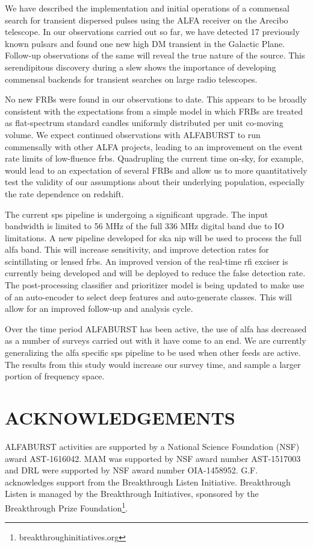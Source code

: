 \documentclass[a4paper,fleqn,usenatbib]{mnras}
\begin{document}
We have described the implementation and initial operations of a commensal
search for transient dispersed pulses using the ALFA receiver on the Arecibo
telescope. In our observations carried out so far, we have detected 17
previously known pulsars and found one new  high DM transient in the Galactic
Plane.  Follow-up observations of the same will reveal the true nature of the
source. This serendipitous discovery during a slew shows the importance of
developing commensal backends for transient searches on large radio telescopes.

No new FRBs were found in our observations to date. This appears to be broadly
consistent with the expectations from a simple model in which FRBs are treated
as flat-spectrum standard candles uniformly distributed per unit co-moving
volume. We expect continued observations with ALFABURST to run commensally with
other ALFA projects, leading to an improvement on the event rate limits of
low-fluence \glspl{frb}. Quadrupling the current time on-sky, for example,
would lead to an expectation of several FRBs and allow us to more
quantitatively test the validity of our assumptions about their underlying
population, especially the rate dependence on redshift.

The current \gls{sps} pipeline is undergoing a significant upgrade. The input
bandwidth is limited to 56 MHz of the full 336 MHz digital band due to IO
limitations. A new pipeline developed for \gls{ska} \gls{nip} will be used to
process the full \gls{alfa} band.  This will increase sensitivity, and improve
detection rates for scintillating or lensed \glspl{frb}.  An improved version
of the real-time \gls{rfi} exciser is currently being developed and will be
deployed to reduce the false detection rate. The post-processing classifier and
prioritizer model is being updated to make use of an auto-encoder to select
deep features and auto-generate classes. This will allow for an improved
follow-up and analysis cycle.

Over the time period ALFABURST has been active, the use of \gls{alfa} has
decreased as a number of surveys carried out with it have come to an end. We
are currently generalizing the \gls{alfa} specific \gls{sps} pipeline to be
used when other feeds are active. The results from this study would increase
our survey time, and sample a larger portion of frequency space. 

\section*{ACKNOWLEDGEMENTS}

ALFABURST activities are supported by a National Science Foundation (NSF) award
AST-1616042.  MAM was supported by NSF award number AST-1517003  and DRL were
supported by NSF award number OIA-1458952.  G.F. acknowledges support from the
Breakthrough Listen Initiative. Breakthrough Listen is managed by the
Breakthrough Initiatives, sponsored by the Breakthrough Prize
Foundation\footnote{breakthroughinitiatives.org}.
 

 

\bsp	%
\label{lastpage}
\end{document}
